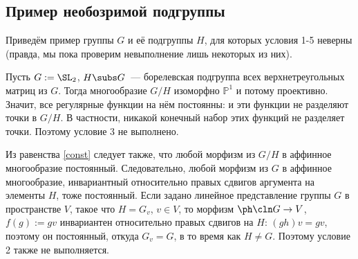 \documentclass{article}
\newcommand{\mbb}{\mathbb}
\begin{document}
\subsection{Пример необозримой подгруппы}
Приведём пример группы $G$ и её подгруппы $H$, для которых условия 1-5
неверны (правда, мы пока проверим невыполнение лишь некоторых из них).

Пусть $G:=\SL_2$, $H\subs G$~--- борелевская подгруппа всех верхнетреугольных матриц из $G$. Тогда многообразие
$G/H$ изоморфно $\mbb{P}^1$ и потому проективно. Значит, все регулярные функции на нём постоянны:
 и эти функции не разделяют точки в $G/H$. В частности, никакой конечный набор
этих функций не разделяет точки. Поэтому условие 3 не выполнено.

Из равенства \eqref{const} следует также, что любой морфизм из $G/H$ в аффинное многообразие постоянный.
Следовательно, любой морфизм из $G$ в аффинное многообразие, инвариантный относительно правых сдвигов аргумента на
элементы $H$, тоже постоянный. Если задано линейное представление группы $G$ в пространстве $V$, такое что
$H=G_v$, $v\in V$, то морфизм $\ph\cln G\to V$, $f(g):=gv$ инвариантен относительно правых сдвигов на $H$:
$(gh)v=gv$, поэтому он постоянный, откуда $G_v=G$, в то время как $H\ne G$. Поэтому условие 2 также не
выполняется.
\end{document}
